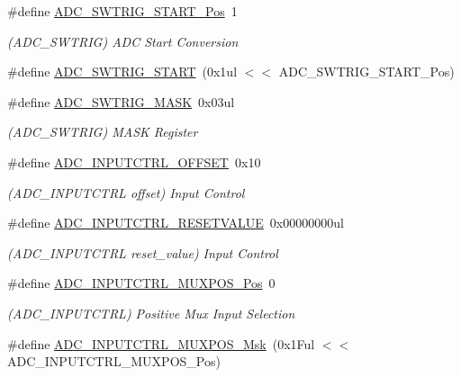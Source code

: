 \begin{DoxyCompactItemize}
\#define \mbox{\hyperlink{group___s_a_m_d21___a_d_c_ga12409e6821f87b501654671ff5dcae55}{A\+D\+C\+\_\+\+S\+W\+T\+R\+I\+G\+\_\+\+S\+T\+A\+R\+T\+\_\+\+Pos}}~1
\begin{DoxyCompactList}\small\item\em (A\+D\+C\+\_\+\+S\+W\+T\+R\+IG) A\+DC Start Conversion \end{DoxyCompactList}\item 
\#define \mbox{\hyperlink{group___s_a_m_d21___a_d_c_ga6a130ae4352fc4bbe067d43950cb485d}{A\+D\+C\+\_\+\+S\+W\+T\+R\+I\+G\+\_\+\+S\+T\+A\+RT}}~(0x1ul $<$$<$ A\+D\+C\+\_\+\+S\+W\+T\+R\+I\+G\+\_\+\+S\+T\+A\+R\+T\+\_\+\+Pos)
\item 
\#define \mbox{\hyperlink{group___s_a_m_d21___a_d_c_ga03f8a2bcff30a481d12adb178c1104f0}{A\+D\+C\+\_\+\+S\+W\+T\+R\+I\+G\+\_\+\+M\+A\+SK}}~0x03ul
\begin{DoxyCompactList}\small\item\em (A\+D\+C\+\_\+\+S\+W\+T\+R\+IG) M\+A\+SK Register \end{DoxyCompactList}\item 
\#define \mbox{\hyperlink{group___s_a_m_d21___a_d_c_ga9692ff2e0c84bb47a64ed6704defc86c}{A\+D\+C\+\_\+\+I\+N\+P\+U\+T\+C\+T\+R\+L\+\_\+\+O\+F\+F\+S\+ET}}~0x10
\begin{DoxyCompactList}\small\item\em (A\+D\+C\+\_\+\+I\+N\+P\+U\+T\+C\+T\+RL offset) Input Control \end{DoxyCompactList}\item 
\#define \mbox{\hyperlink{group___s_a_m_d21___a_d_c_ga91cf2e939a7345b5a26ff492a176f647}{A\+D\+C\+\_\+\+I\+N\+P\+U\+T\+C\+T\+R\+L\+\_\+\+R\+E\+S\+E\+T\+V\+A\+L\+UE}}~0x00000000ul
\begin{DoxyCompactList}\small\item\em (A\+D\+C\+\_\+\+I\+N\+P\+U\+T\+C\+T\+RL reset\+\_\+value) Input Control \end{DoxyCompactList}\item 
\#define \mbox{\hyperlink{group___s_a_m_d21___a_d_c_ga583868be285e1c06c9a93dfd552d8c6a}{A\+D\+C\+\_\+\+I\+N\+P\+U\+T\+C\+T\+R\+L\+\_\+\+M\+U\+X\+P\+O\+S\+\_\+\+Pos}}~0
\begin{DoxyCompactList}\small\item\em (A\+D\+C\+\_\+\+I\+N\+P\+U\+T\+C\+T\+RL) Positive Mux Input Selection \end{DoxyCompactList}\item 
\#define \mbox{\hyperlink{group___s_a_m_d21___a_d_c_ga2a4879aff5af3c137d6e63102c94b804}{A\+D\+C\+\_\+\+I\+N\+P\+U\+T\+C\+T\+R\+L\+\_\+\+M\+U\+X\+P\+O\+S\+\_\+\+Msk}}~(0x1\+Ful $<$$<$ A\+D\+C\+\_\+\+I\+N\+P\+U\+T\+C\+T\+R\+L\+\_\+\+M\+U\+X\+P\+O\+S\+\_\+\+Pos)

\end{DoxyCompactItemize}
